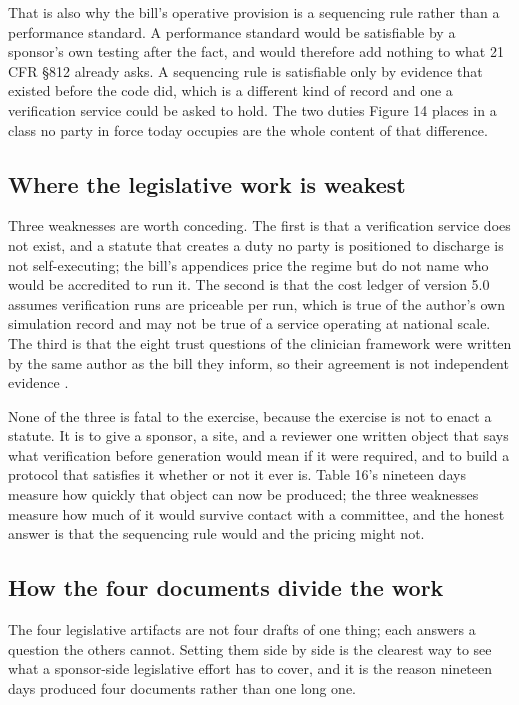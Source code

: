 That is also why the bill's operative provision is a sequencing rule rather than
a performance standard. A performance standard would be satisfiable by a
sponsor's own testing after the fact, and would therefore add nothing to what 21
CFR \S 812 already asks. A sequencing rule is satisfiable only by evidence that
existed before the code did, which is a different kind of record and one a
verification service could be asked to hold. The two duties Figure 14 places in
a class no party in force today occupies are the whole content of that
difference.

\subsection{Where the legislative work is weakest}

Three weaknesses are worth conceding. The first is that a verification service
does not exist, and a statute that creates a duty no party is positioned to
discharge is not self-executing; the bill's appendices price the regime but do
not name who would be accredited to run it. The second is that the cost ledger
of version 5.0 assumes verification runs are priceable per run, which is true of
the author's own simulation record and may not be true of a service operating at
national scale. The third is that the eight trust questions of the clinician
framework were written by the same author as the bill they inform, so their
agreement is not independent evidence \cite{clintrust, hr9510billv5}.

None of the three is fatal to the exercise, because the exercise is not to enact
a statute. It is to give a sponsor, a site, and a reviewer one written object
that says what verification before generation would mean if it were required,
and to build a protocol that satisfies it whether or not it ever is. Table 16's
nineteen days measure how quickly that object can now be produced; the three
weaknesses measure how much of it would survive contact with a committee, and
the honest answer is that the sequencing rule would and the pricing might not.

\subsection{How the four documents divide the work}

The four legislative artifacts are not four drafts of one thing; each answers a
question the others cannot. Setting them side by side is the clearest way to see
what a sponsor-side legislative effort has to cover, and it is the reason
nineteen days produced four documents rather than one long one.

